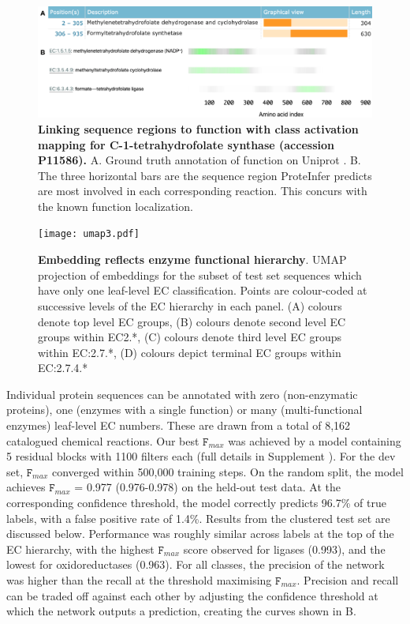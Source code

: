 \begin{figure}[t]
  \centering
    \includegraphics[width=\textwidth]{tetrahydrofolate_synthase.png}
    \caption{\textbf{Linking sequence regions to function with class activation mapping for C-1-tetrahydrofolate synthase (accession P11586).} A. Ground truth annotation of function on Uniprot \citep{uniprotlatest}. B. The three horizontal bars are the sequence region ProteInfer predicts are most involved in each corresponding reaction. This concurs with the known function localization. }
    \label{fig:cam}
  \end{figure}

  \begin{figure}
    \centering
      \texttt{[image: umap3.pdf]}%
      \caption{\textbf{Embedding reflects enzyme functional hierarchy}. UMAP projection of embeddings for the subset of test set sequences which have only one leaf-level EC classification. Points are colour-coded at successive levels of the EC hierarchy in each panel. (A) colours denote top level EC groups, (B) colours denote second level EC groups within EC2.*, (C) colours denote third level EC groups within EC:2.7.*, (D) colours depict terminal EC groups within EC:2.7.4.* }
      \label{fig:umap}
    \end{figure}

Individual protein sequences can be annotated with zero (non-enzymatic proteins), one (enzymes with a single function) or many (multi-functional enzymes) leaf-level EC numbers. These are drawn from a total of 8,162 catalogued chemical reactions.
Our best $\texttt{F}_{max}$ was achieved by a model containing 5 residual blocks with 1100 filters each (full details in \textnormal{ Supplement}%
). For the dev set, $\texttt{F}_{max}$ converged within 500,000 training steps. On the random split, the model achieves $\texttt{F}_{max}$ = 0.977 (0.976-0.978) on the held-out test data. At the corresponding confidence threshold, the model correctly predicts 96.7\% of true labels, with a false positive rate of 1.4\%. Results from the clustered test set are discussed below.
Performance was roughly similar across labels at the top of the EC hierarchy, with the highest $\texttt{F}_{max}$ score observed for ligases (0.993), and the lowest for oxidoreductases (0.963). For all classes, the precision of the network was higher than the recall at the threshold maximising $\texttt{F}_{max}$. Precision and recall can be traded off against each other by adjusting the confidence threshold at which the network outputs a prediction, creating the curves shown in B.%


